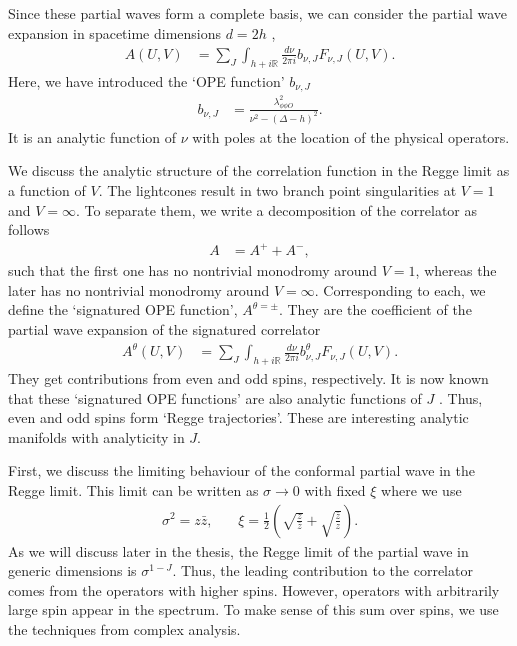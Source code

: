 Since these partial waves form a complete basis, we can consider the partial wave expansion in spacetime dimensions $ d = 2 h $ \cite{Costa:2012cb, Caron-Huot:2017vep},
\begin{align}
  A\left( U,V \right) & = \displaystyle\sum_{J} \displaystyle\int_{h+ i \mathbb{R}}
  \frac{
    d\nu}{2\pi i }
  b_{\nu,J} F_{\nu,J}\left( U,V \right).                                                    
\end{align}
Here, we have introduced the `OPE function' $ b_{\nu,J} $
\begin{align}
  b_{\nu,J}           & =\frac{ \lambda_{\phi \phi O}^2}{\nu^2 - \left( \Delta-h \right)^2}
.\end{align}
It is an analytic function of $ \nu $ with poles at the location of the physical operators.

We discuss the analytic structure of the correlation function in the Regge limit as a function of $ V $.
The lightcones result in two branch point singularities at $ V = 1 $ and $ V= \infty $.
To separate them, we write a decomposition of the correlator \cite{Costa:2012cb} as follows
\begin{align}
  A & =
  A^{+} +
  A^{-}
  ,\end{align}
such that the first one has no nontrivial monodromy around $ V =1  $, whereas the later has no nontrivial monodromy around $ V= \infty $.
Corresponding to each, we define the `signatured OPE function', $ A^{\theta = \pm} $.
They are the coefficient of the partial wave expansion of the signatured correlator
\begin{align}
  A^{\theta }\left( U,V \right) & = \displaystyle\sum_{J} \displaystyle\int_{h+ i \mathbb{R}}
  \frac{
    d\nu}{2\pi i }
  b_{\nu,J}^{\theta} F_{\nu,J}\left( U,V \right)
  .
\end{align}
They get contributions from even and odd spins, respectively.
It is now known that these `signatured OPE functions' are also analytic functions of $ J $ \cite{Caron-Huot:2017vep}.
Thus, even and odd spins form `Regge trajectories'.
These are interesting analytic manifolds with analyticity in $ J $.

First, we discuss the limiting behaviour of the conformal partial wave in the Regge limit.
This limit can be written as $ \sigma \rightarrow 0 $ with fixed $ \xi  $ where we use
\begin{align}
  \sigma^2 = z \bar{z}, \, &  & \xi =
  \frac{1}{2} \left(
  \sqrt{\frac{z}{\bar{z}}} + \sqrt{\frac{\bar{z}}{z}}
  \right)
  .\end{align}
As we will discuss later in the thesis, the Regge limit of the partial wave in generic dimensions is $ \sigma^{1-J}  $.
Thus, the leading contribution to the correlator comes from the operators with higher spins.
However, operators with arbitrarily large spin appear in the spectrum.
To make sense of this sum over spins, we use the techniques from complex analysis.


